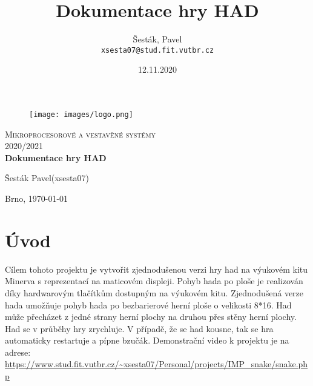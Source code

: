 \documentclass[12pt,english]{article}
\author{
  Šesták, Pavel\\
  \texttt{xsesta07@stud.fit.vutbr.cz}
}
\title{Dokumentace hry HAD}
\date{12.11.2020}
\begin{document}
  \begin{titlepage}
		\begin{center}

			\begin{figure}
				\center\texttt{[image: images/logo.png]}
			\end{figure}

			\vspace{3cm}

			\textsc{\LARGE Mikroprocesorové a vestavěné systémy } \\[0.5cm]
			\textsc{\LARGE 2020/2021} \\[3.5cm]

			\textbf{\LARGE Dokumentace hry HAD} \\
			\vspace{3cm}
		    \vspace{3cm}
		    
		    {\Large Šesták Pavel(xsesta07)} \\[0.5cm]
		    
			
			\vspace{3cm}
                
		    \textsc{}{\LARGE Brno, \today}

		\end{center}
	\end{titlepage}
\begin{center}
	\tableofcontents %
	\clearpage %
\end{center}

\section{Úvod}
Cílem tohoto projektu je vytvořit zjednodušenou verzi hry had na výukovém kitu Minerva s reprezentací na maticovém displeji. Pohyb hada po ploše je realizován díky hardwarovým tlačítkům dostupným na výukovém kitu. Zjednodušená verze hada umožňuje pohyb hada po bezbarierové herní ploše o velikosti 8*16. Had může přecházet z jedné strany herní plochy na druhou přes stěny herní plochy. Had se v průběhy hry zrychluje. V případě, že se had kousne, tak se hra automaticky restartuje a pípne bzučák.
Demonstrační video k projektu je na adrese: \url{https://www.stud.fit.vutbr.cz/~xsesta07/Personal/projects/IMP\_snake/snake.php}
\end{document}
